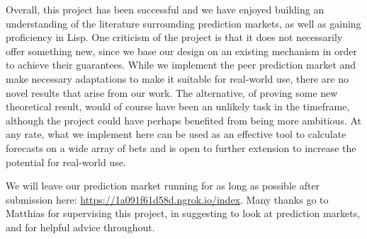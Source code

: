 Overall, this project has been successful and we have enjoyed building an
understanding of the literature surrounding prediction markets, as well as
gaining proficiency in Lisp. One criticism of the project is that it does not
necessarily offer something new, since we base our design on an existing
mechanism in order to achieve their guarantees. While we implement the peer
prediction market and make necessary adaptations to make it suitable for
real-world use, there are no novel results that arise from our work. The
alternative, of proving some new theoretical result, would of course have been
an unlikely task in the timeframe, although the project could have perhaps
benefited from being more ambitious. At any rate, what we implement here can
be used as an effective tool to calculate forecasts on a wide array of bets and
is open to further extension to increase the potential for real-world use.

We will leave our prediction market running for as long as possible after
submission here: \url{https://1a091f61d58d.ngrok.io/index}. Many thanks go to
Matthias for supervising this project, in suggesting to look at prediction
markets, and for helpful advice throughout.
